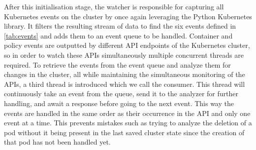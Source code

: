 After this initialisation stage, the watcher is responsible for capturing all Kubernetes events on the cluster by once again leveraging the Python Kubernetes library. It filters the resulting stream of data to find the six events defined in \autoref{tab:events} and adds them to an event queue to be handled. Container and policy events are outputted by different API endpoints of the Kubernetes cluster, so in order to watch these APIs simultaneously multiple concurrent threads are required. To retrieve the events from the event queue and analyze them for changes in the cluster, all while maintaining the simultaneous monitoring of the APIs, a third thread is introduced which we call the consumer. This thread will continuously take an event from the queue, send it to the analyzer for further handling, and await a response before going to the next event. This way the events are handled in the same order as their occurrence in the API and only one event at a time. This prevents mistakes such as trying to analyze the deletion of a pod without it being present in the last saved cluster state since the creation of that pod has not been handled yet. 
\\[10pt]
